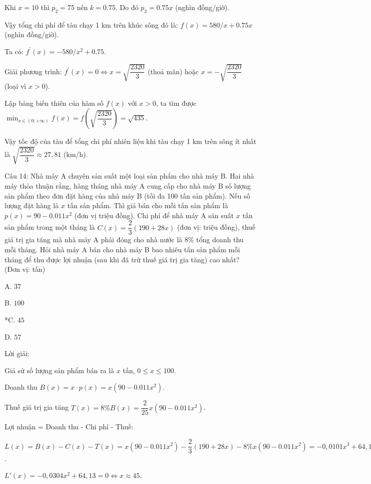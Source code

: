 \documentclass[a4paper,12pt]{article}
\begin{document}
Khi \(x=10\) thì \(p_2=75\) nên \(k=0.75\). Do đó \(p_2=0.75 x\) (nghìn đồng/giờ).

Vậy tổng chi phí để tàu chạy 1 km trên khúc sông đó là: \(f(x)=580/x+0.75 x\) (nghìn đồng/giờ).

Ta có: \(f^{\prime}(x)=-580/x^2+0.75\).

        Giải phương trình: \(f^{\prime}(x)=0 \Leftrightarrow x=\sqrt{\dfrac{2320}{3}}\) (thoả mãn) hoặc \(x=-\sqrt{\dfrac{2320}{3}}\) (loại vì \(x>0\)).

        Lập bảng biến thiên của hàm số \(f(x)\) với \(x>0\), ta tìm được \(\min_{x \in(0 ;+\infty)} f(x)=f(\sqrt{\dfrac{2320}{3}})=\sqrt{435}\).

        Vậy tốc độ của tàu để tổng chi phí nhiên liệu khi tàu chạy 1 km trên sông ít nhất là \(\sqrt{\dfrac{2320}{3}} \approx 27,81\) (km/h).




Câu 14: Nhà máy A chuyên sản suất một loại sản phẩm cho nhà máy B. Hai nhà máy thỏa thuận rằng, hàng tháng nhà máy A cung cấp cho nhà máy B số lượng sản phẩm theo đơn đặt hàng của nhà máy B (tối đa 100 tấn sản phẩm). Nếu số lượng đặt hàng là \(x\)  tấn sản phẩm. Thì giá bán cho mỗi tấn sản phẩm là \(p(x)=90-0.011 x^2\) (đơn vị triệu đồng). Chi phí để nhà máy A sản suất \(x\)  tấn sản phẩm trong một tháng là \(C(x)=\dfrac{2}{3}(190+28 x)\) (đơn vị: triệu đồng), thuế giá trị gia tăng mà nhà máy A phải đóng cho nhà nước là 8\% tổng doanh thu mỗi tháng. Hỏi nhà máy A bán cho nhà máy B bao nhiêu tấn sản phẩm mỗi tháng để thu được lợi nhuận (sau khi đã trừ thuế giá trị gia tăng) cao nhất? (Đơn vị: tấn)

A. \(37\)

B. \(100\)

*C. \(45\)

D. \(57\)

Lời giải:


Giả sử số lượng sản phẩm bán ra là \(x\) tấn, \(0 \leq x \leq 100\).

Doanh thu \(B(x) = x \cdot p(x) = x(90 - 0.011x^2)\).

Thuế giá trị gia tăng \(T(x) = 8\% B(x) = \dfrac{2}{25} x(90 - 0.011x^2)\).

Lợi nhuận = Doanh thu - Chi phí - Thuế:

\(L(x) = B(x) - C(x) - T(x) = x(90 - 0.011x^2) - \dfrac{2}{3}(190 + 28x) - 8\% x(90 - 0.011x^2) = -0,0101x^3 + 64,13x + -126,67\).

\(L'(x) = -0,0304x^2 + 64,13 = 0 \Leftrightarrow x \approx 45\).
\end{document}
